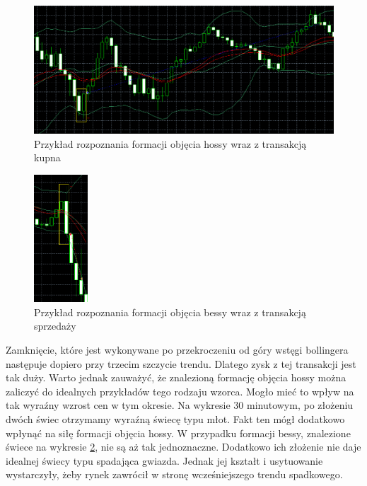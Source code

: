\documentclass[pdflatex,11pt]{aghdpl}
\begin{document}
\begin{figure}[h!]
\begin{center}
\includegraphics[width=14cm]{bullishengulfing/przyklad.png}
\caption{Przykład rozpoznania formacji objęcia hossy wraz z transakcją kupna}
\label{przyklad_objecie_hossy}
\end{center}
\end{figure} 
\begin{figure}[h!]
\begin{center}
\includegraphics[width=2cm]{bearishengulfing/przyklad.png}
\caption{Przykład rozpoznania formacji objęcia bessy wraz z transakcją sprzedaży}
\label{przyklad_objecie_bessy}
\end{center}
\end{figure} 
Zamknięcie, które jest wykonywane po przekroczeniu od góry wstęgi bollingera następuje dopiero przy trzecim szczycie trendu. Dlatego zysk z tej transakcji jest tak duży. Warto jednak zauważyć, że znalezioną formację objęcia hossy można zaliczyć do idealnych przykładów tego rodzaju wzorca. Mogło mieć to wpływ na tak wyraźny wzrost cen w tym okresie. Na wykresie 30 minutowym, po złożeniu dwóch świec otrzymamy wyraźną świecę typu młot. Fakt ten mógł dodatkowo wpłynąć na siłę formacji objęcia hossy. W przypadku formacji bessy, znalezione świece na wykresie \ref{przyklad_objecie_bessy}, nie są aż tak jednoznaczne. Dodatkowo ich złożenie nie daje idealnej świecy typu spadająca gwiazda. Jednak jej kształt i usytuowanie wystarczyły, żeby rynek zawrócił w stronę wcześniejszego trendu spadkowego.
\end{document}
